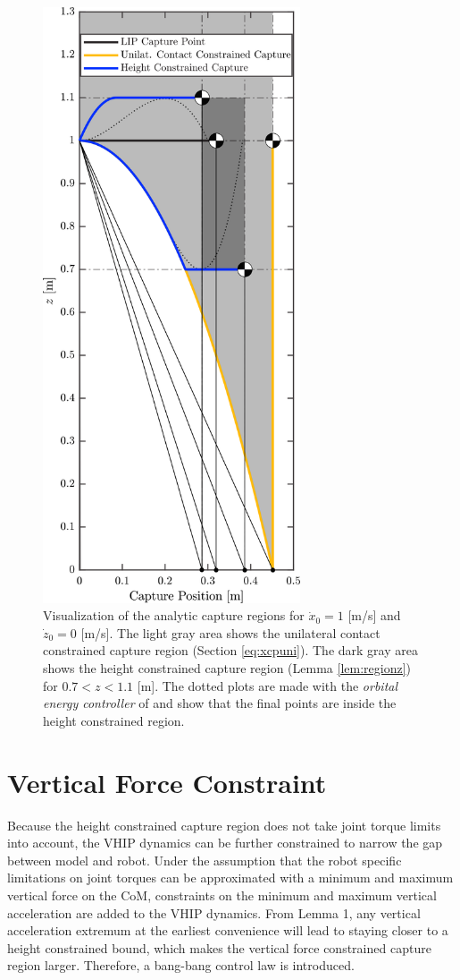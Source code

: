 \begin{figure}
      \centering
      \includegraphics[width=3in]{STYLESTUFF/CPLimitsDark1.png}
      \caption{Visualization of the analytic capture regions for $\dot{x}_0=1$ [m/s] and $\dot{z}_0=0$ [m/s]. The light gray area shows the unilateral contact constrained capture region (Section \ref{eq:xcpuni}). The dark gray area shows the height constrained capture region (Lemma \ref{lem:regionz})  for $0.7<z<1.1$ [m]. The dotted plots are made with the \textit{orbital energy controller} of \cite{koolen2016balance} and show that the final points are inside the height constrained region.}
      \label{fig:capregion}
\end{figure}

\section{Vertical Force Constraint}\label{sec:verticalforce}
Because the height constrained capture region does not take joint torque limits into account, the \ac{VHIP} dynamics can be further constrained to narrow the gap between model and robot. Under the assumption that the robot specific limitations on joint torques can be approximated with a minimum and maximum vertical force on the \ac{CoM}, constraints on the minimum and maximum vertical acceleration are added to the \ac{VHIP} dynamics. From Lemma 1, any vertical acceleration extremum at the earliest convenience will lead to staying closer to a height constrained bound, which makes the vertical force constrained capture region larger. Therefore, a bang-bang control law is introduced.
     
